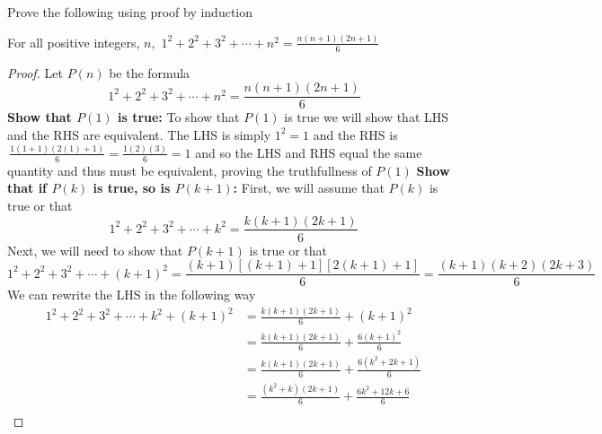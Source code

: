 \documentclass[addpoints]{exam}
\begin{document}
\vspace{1in}

\noindent{}

\vspace{.1in}

\begin{center}
\end{center}

\begin{questions}
	\question Prove the following using proof by induction
	\begin{center}
		For all positive integers, $n$, $\displaystyle\,1^2 + 2^2 + 3^2 + \cdots + n^2 = \frac{n(n+1)(2n+1)}{6}$
	\end{center}
	\begin{solution}[\stretch{1}]
		\begin{proof}
			Let $P(n)$ be the formula \[\displaystyle\,1^2 + 2^2 + 3^2 + \cdots + n^2 = \frac{n(n+1)(2n+1)}{6}\]
			\textbf{Show that $P(1)$ is true:} To show that $P(1)$ is true we will show that LHS and the RHS are equivalent. The LHS is simply $1^2=1$ and the RHS is $\displaystyle\, \frac{1(1+1)(2(1)+1)}{6} = \frac{1(2)(3)}{6} = 1$ and so the LHS and RHS equal the same quantity and thus must be equivalent, proving the truthfullness of $P(1)$
			\newline\textbf{Show that if $P(k)$ is true, so is $P(k+1)$:} First, we will assume that $P(k)$ is true or that
			\[
				1^2 + 2^2 + 3^2 + \cdots + k^2 = \frac{k(k+1)(2k+1)}{6}
			\]
			Next, we will need to show that $P(k+1)$ is true or that
			\[
				1^2 + 2^2 + 3^2 + \cdots + (k+1)^2 = \frac{(k+1)\left[\left(k+1\right)+1\right]\left[2\left(k+1\right)+1\right]}{6} = \frac{(k+1)(k+2)(2k+3)}{6}
			\]
			We can rewrite the LHS in the following way
			\begin{align*}
				1^2 + 2^2 + 3^2 + \cdots + k^2 + (k+1)^2 & = \frac{k(k+1)(2k+1)}{6} + (k+1)^2                           \\
				                                         & = \frac{k(k+1)(2k+1)}{6} + \frac{6(k+1)^2}{6}                \\
				                                         & = \frac{k(k+1)(2k+1)}{6} + \frac{6(k^2 + 2k + 1)}{6}         \\
				                                         & = \frac{(k^2+k)(2k+1)}{6} + \frac{6k^2 + 12k + 6}{6}         \\

\end{align*}
\end{proof}
\end{solution}
\end{questions}
\end{document}
